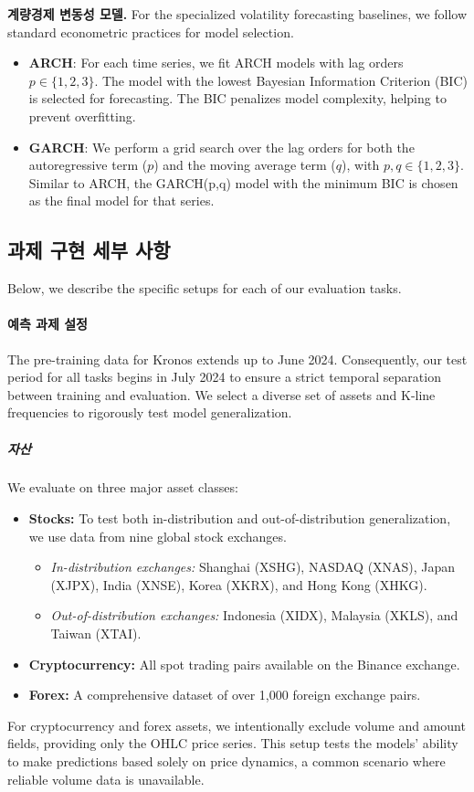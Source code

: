 \noindent\textbf{계량경제 변동성 모델.}
For the specialized volatility forecasting baselines, we follow standard econometric practices for model selection.
\begin{itemize}
    \item \textbf{ARCH}: For each time series, we fit ARCH models with lag orders $p \in \{1, 2, 3\}$. The model with the lowest Bayesian Information Criterion (BIC) is selected for forecasting. The BIC penalizes model complexity, helping to prevent overfitting.
    \item \textbf{GARCH}: We perform a grid search over the lag orders for both the autoregressive term ($p$) and the moving average term ($q$), with $p, q \in \{1, 2, 3\}$. Similar to ARCH, the GARCH(p,q) model with the minimum BIC is chosen as the final model for that series.
\end{itemize}

\subsection{과제 구현 세부 사항}
Below, we describe the specific setups for each of our evaluation tasks.

\paragraph{예측 과제 설정}

The pre-training data for Kronos extends up to June 2024. Consequently, our test period for all tasks begins in July 2024 to ensure a strict temporal separation between training and evaluation. We select a diverse set of assets and K-line frequencies to rigorously test model generalization.

\subparagraph{자산} We evaluate on three major asset classes:
\begin{itemize}
    \item \textbf{Stocks:} To test both in-distribution and out-of-distribution generalization, we use data from nine global stock exchanges.
    \begin{itemize}
        \item \textit{In-distribution exchanges:} Shanghai (XSHG), NASDAQ (XNAS), Japan (XJPX), India (XNSE), Korea (XKRX), and Hong Kong (XHKG).
        \item \textit{Out-of-distribution exchanges:} Indonesia (XIDX), Malaysia (XKLS), and Taiwan (XTAI).
    \end{itemize}
    \item \textbf{Cryptocurrency:} All spot trading pairs available on the Binance exchange.
    \item \textbf{Forex:} A comprehensive dataset of over 1,000 foreign exchange pairs.
\end{itemize}
For cryptocurrency and forex assets, we intentionally exclude volume and amount fields, providing only the OHLC price series. This setup tests the models' ability to make predictions based solely on price dynamics, a common scenario where reliable volume data is unavailable.


